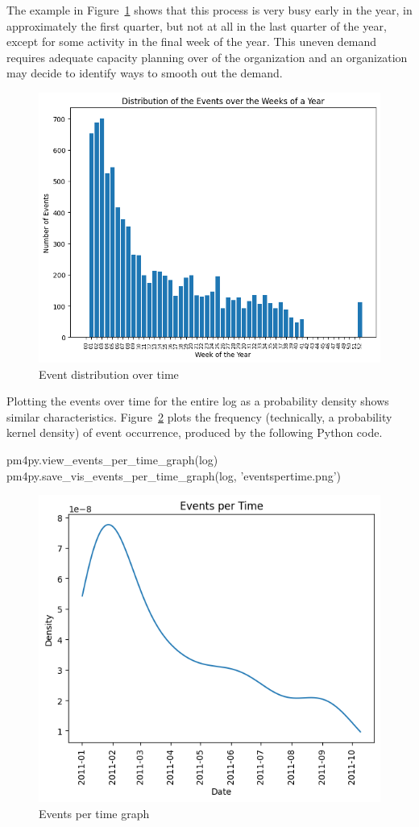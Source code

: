 The example in Figure~\ref{fig:event_distribution} shows that this process is very busy early in the year, in approximately the first quarter, but not at all in the last quarter of the year, except for some activity in the final week of the year. This uneven demand requires adequate capacity planning over of the organization and an organization may decide to identify ways to smooth out the demand. 

\begin{figure}
\centering
\includegraphics[width=.7\textwidth]{eventsdistribution.png}
\caption{Event distribution over time}
\label{fig:event_distribution}
\end{figure}

Plotting the events over time for the entire log as a probability density shows similar characteristics. Figure~\ref{fig:events_per_time} plots the frequency (technically, a probability kernel density) of event occurrence, produced by the following Python code.

\begin{samepage}
\begin{pythoncode}
pm4py.view_events_per_time_graph(log)
pm4py.save_vis_events_per_time_graph(log, 'eventspertime.png')
\end{pythoncode}
\end{samepage}

\begin{figure}
\centering
\includegraphics[width=.7\textwidth]{eventspertime.png}
\caption{Events per time graph}
\label{fig:events_per_time}
\end{figure}

